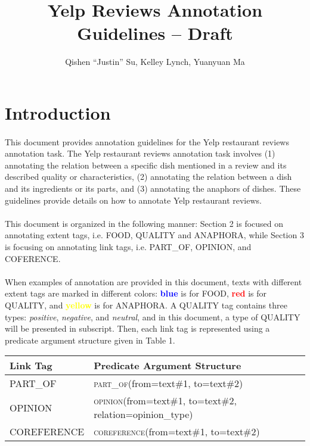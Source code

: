 \documentclass{article}
\title{Yelp Reviews Annotation Guidelines -- Draft}
\author{Qishen ``Justin'' Su, Kelley Lynch, Yuanyuan Ma}
\begin{document}
\newpage
{}
\maketitle

\tableofcontents

\newpage
\section{Introduction}
\paragraph{}
This document provides annotation guidelines for the Yelp restaurant reviews annotation task. The Yelp restaurant reviews annotation task involves (1) annotating the relation between a specific dish mentioned in a review and its described quality or characteristics, (2) annotating the relation between a dish and its ingredients or its parts, and (3) annotating the anaphors of dishes. These guidelines provide details on how to annotate Yelp restaurant reviews. 
\paragraph{}
This document is organized in the following manner: Section 2 is focused on annotating extent tags, i.e. FOOD, QUALITY and ANAPHORA, while Section 3 is focusing on annotating link tags, i.e. PART\_OF, OPINION, and COFERENCE. 
\paragraph{}
When examples of annotation are provided in this document, texts with different extent tags are marked in different colors: \textbf{\textcolor{blue}{blue}} is for FOOD, \textbf{\textcolor{red}{red}} is for QUALITY, and \textbf{\textcolor{yellow}{yellow}} is for ANAPHORA. A QUALITY tag contains three types: \textit{positive}, \textit{negative}, and \textit{neutral}, and in this document, a type of QUALITY will be presented in subscript. Then, each link tag is represented using a predicate argument structure given in Table 1. 
\\
\begin{minipage}{\linewidth}
\centering
{} \label{tab:title} 
\begin{tabular}{ll}\toprule[1.5pt]
\bf Link Tag & \bf Predicate Argument Structure \\\midrule
PART\_OF   &    \textsc{part\_of}(from=text\#1, to=text\#2)    \\
OPINION & \textsc{opinion}(from=text\#1, to=text\#2, relation=opinion\_type)  \\
COREFERENCE &   \textsc{coreference}(from=text\#1, to=text\#2) \\
\bottomrule[1.25pt]
\end {tabular}\par
\end{minipage}
\end{document}
